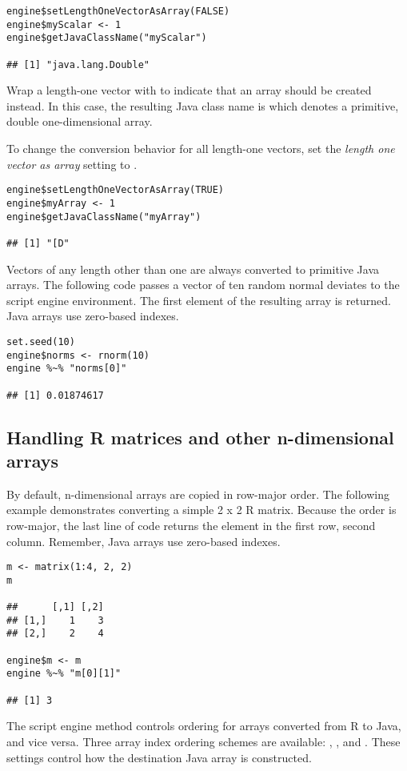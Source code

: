 \begin{verbatim}
engine$setLengthOneVectorAsArray(FALSE)
engine$myScalar <- 1
engine$getJavaClassName("myScalar")

## [1] "java.lang.Double"
\end{verbatim}
Wrap a length-one vector with  to indicate that an array should be created instead. In this case, the resulting Java class name is \code{"[D"} which denotes a primitive, double one-dimensional array.

To change the conversion behavior for all length-one vectors, set the \textit{length one vector as array} setting to .
\begin{verbatim}
engine$setLengthOneVectorAsArray(TRUE)
engine$myArray <- 1
engine$getJavaClassName("myArray")

## [1] "[D"
\end{verbatim}

Vectors of any length other than one are always converted to primitive Java arrays. The following code passes a vector of ten random normal deviates to the script engine environment. The first element of the resulting array is returned.  Java arrays use zero-based indexes.

\begin{verbatim}
set.seed(10)
engine$norms <- rnorm(10)
engine %~% "norms[0]"

## [1] 0.01874617
\end{verbatim}

\subsection{Handling R matrices and other n-dimensional arrays}

By default, n-dimensional arrays are copied in row-major order. The following example demonstrates converting a simple 2 x 2 R matrix. Because the order is row-major, the last line of code returns the element in the first row, second column. Remember, Java arrays use zero-based indexes.

\begin{verbatim}
m <- matrix(1:4, 2, 2)
m

##      [,1] [,2]
## [1,]    1    3
## [2,]    2    4

engine$m <- m
engine %~% "m[0][1]"

## [1] 3
\end{verbatim}

The  script engine method controls ordering for arrays converted from R to Java, and vice versa. Three array index ordering schemes are available: , , and . These settings control how the destination Java array is constructed.

